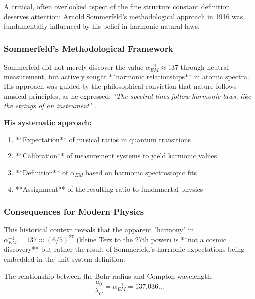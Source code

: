 \documentclass[12pt,a4paper]{article}
\begin{document}
A critical, often overlooked aspect of the fine structure constant definition deserves attention: Arnold Sommerfeld's methodological approach in 1916 was fundamentally influenced by his belief in harmonic natural laws.

\subsubsection{Sommerfeld's Methodological Framework}

Sommerfeld did not merely discover the value $\alpha_{EM}^{-1} \approx 137$ through neutral measurement, but actively sought **harmonic relationships** in atomic spectra. His approach was guided by the philosophical conviction that nature follows musical principles, as he expressed: \textit{"The spectral lines follow harmonic laws, like the strings of an instrument"} \cite{Sommerfeld1916}.

\begin{tcolorbox}[colback=orange!5!white,colframe=orange!75!black,title=Sommerfeld's Harmonic Methodology]
	\textbf{His systematic approach:}
	\begin{enumerate}
		\item **Expectation** of musical ratios in quantum transitions
		\item **Calibration** of measurement systems to yield harmonic values  
		\item **Definition** of $\alpha_{EM}$ based on harmonic spectroscopic fits
		\item **Assignment** of the resulting ratio to fundamental physics
	\end{enumerate}
\end{tcolorbox}

\subsubsection{Consequences for Modern Physics}

This historical context reveals that the apparent "harmony" in $\alpha_{EM}^{-1} = 137 \approx (6/5)^{27}$ (kleine Terz to the 27th power) is **not a cosmic discovery** but rather the result of Sommerfeld's harmonic expectations being embedded in the unit system definition.

The relationship between the Bohr radius and Compton wavelength:
\begin{equation}
	\frac{a_0}{\lambda_C} = \alpha_{EM}^{-1} = 137.036...
\end{equation}
\end{document}
